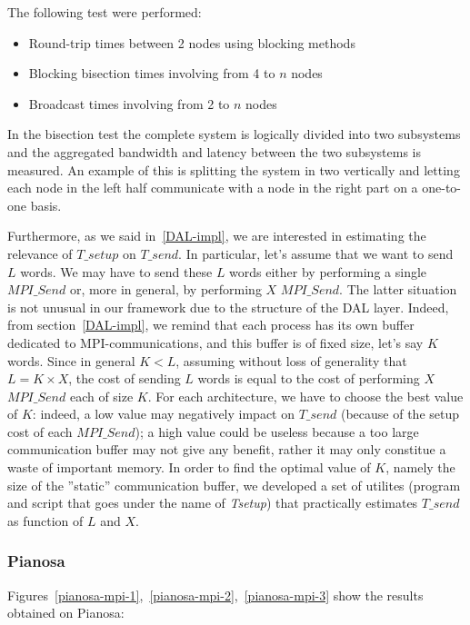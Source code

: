 The following test were performed:
\begin{itemize}
	\item Round-trip times between 2 nodes using blocking methods
	\item Blocking bisection times involving from 4 to $n$ nodes
	\item Broadcast times involving from 2 to $n$ nodes
\end{itemize}
In the bisection test the complete system is logically divided into two subsystems and the aggregated bandwidth and latency between the two subsystems is measured. An example of this is splitting the system in two vertically and letting each node in the left half communicate with a node in the right part on a one-to-one basis.

Furthermore, as we said in~\ref{DAL-impl}, we are interested in estimating the relevance of $T\_setup$ on $T\_send$. In particular, let's assume that we want to send $L$ words. We may have to send these $L$ words either by performing a single $MPI\_Send$ or, more in general, by performing $X$ $MPI\_Send$. The latter situation is not unusual in our framework due to the structure of the DAL layer. Indeed, from section~\ref{DAL-impl}, we remind that each process has its own buffer dedicated to MPI-communications, and this buffer is of fixed size, let's say $K$ words. Since in general $K < L$, assuming without loss of generality that $L = K \times X$, the cost of sending $L$ words is equal to the cost of performing $X$ $MPI\_Send$ each of size $K$. For each architecture, we have to choose the best value of $K$: indeed, a low value may negatively impact on $T\_send$ (because of the setup cost of each $MPI\_Send$); a high value could be useless because a too large communication buffer may not give any benefit, rather it may only constitue a waste of important memory. In order to find the optimal value of $K$, namely the size of the ''static'' communication buffer, we developed a set of utilites (program and script that goes under the name of \textit{Tsetup}) that practically estimates $T\_send$ as function of $L$ and $X$. 

\subsubsection*{Pianosa}
\label{test-env-pianosa}
Figures~\ref{pianosa-mpi-1},~\ref{pianosa-mpi-2},~\ref{pianosa-mpi-3} show the results obtained on Pianosa:

